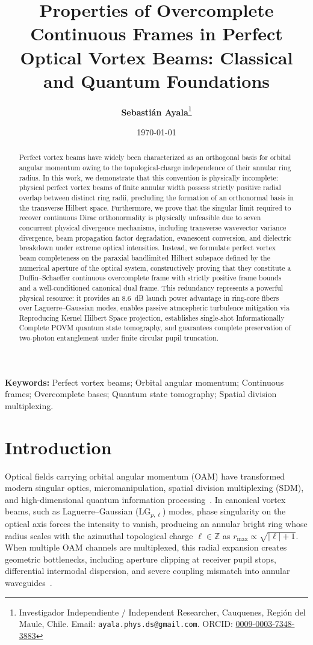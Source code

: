\documentclass[11pt,a4paper]{article}
\title{\textbf{\LARGE Properties of Overcomplete Continuous Frames in Perfect Optical Vortex Beams: Classical and Quantum Foundations}}
\author{\textbf{Sebastián Ayala}\thanks{Investigador Independiente / Independent Researcher, Cauquenes, Regi{\'o}n del Maule, Chile. Email: \texttt{ayala.phys.ds@gmail.com}. ORCID: \href{https://orcid.org/0009-0003-7348-3883}{0009-0003-7348-3883}}}
\date{\today}
\begin{document}
\maketitle

\begin{abstract}
Perfect vortex beams have widely been characterized as an orthogonal basis for orbital angular momentum owing to the topological-charge independence of their annular ring radius. In this work, we demonstrate that this convention is physically incomplete: physical perfect vortex beams of finite annular width possess strictly positive radial overlap between distinct ring radii, precluding the formation of an orthonormal basis in the transverse Hilbert space. Furthermore, we prove that the singular limit required to recover continuous Dirac orthonormality is physically unfeasible due to seven concurrent physical divergence mechanisms, including transverse wavevector variance divergence, beam propagation factor degradation, evanescent conversion, and dielectric breakdown under extreme optical intensities. Instead, we formulate perfect vortex beam completeness on the paraxial bandlimited Hilbert subspace defined by the numerical aperture of the optical system, constructively proving that they constitute a Duffin--Schaeffer continuous overcomplete frame with strictly positive frame bounds and a well-conditioned canonical dual frame. This redundancy represents a powerful physical resource: it provides an 8.6~dB launch power advantage in ring-core fibers over Laguerre--Gaussian modes, enables passive atmospheric turbulence mitigation via Reproducing Kernel Hilbert Space projection, establishes single-shot Informationally Complete POVM quantum state tomography, and guarantees complete preservation of two-photon entanglement under finite circular pupil truncation.
\end{abstract}

\vspace{0.5em}
\noindent\textbf{Keywords:} Perfect vortex beams; Orbital angular momentum; Continuous frames; Overcomplete bases; Quantum state tomography; Spatial division multiplexing.

\section{Introduction}
\label{sec:intro}

Optical fields carrying orbital angular momentum (OAM) have transformed modern singular optics, micromanipulation, spatial division multiplexing (SDM), and high-dimensional quantum information processing~\cite{Allen1992,Gbur2016,Mair2001}. In canonical vortex beams, such as Laguerre--Gaussian ($\text{LG}_{p, \ell}$) modes, phase singularity on the optical axis forces the intensity to vanish, producing an annular bright ring whose radius scales with the azimuthal topological charge $\ell \in \mathbb{Z}$ as $r_{\max} \propto \sqrt{|\ell| + 1}$. When multiple OAM channels are multiplexed, this radial expansion creates geometric bottlenecks, including aperture clipping at receiver pupil stops, differential intermodal dispersion, and severe coupling mismatch into annular waveguides~\cite{Villalba2023}.
\end{document}
